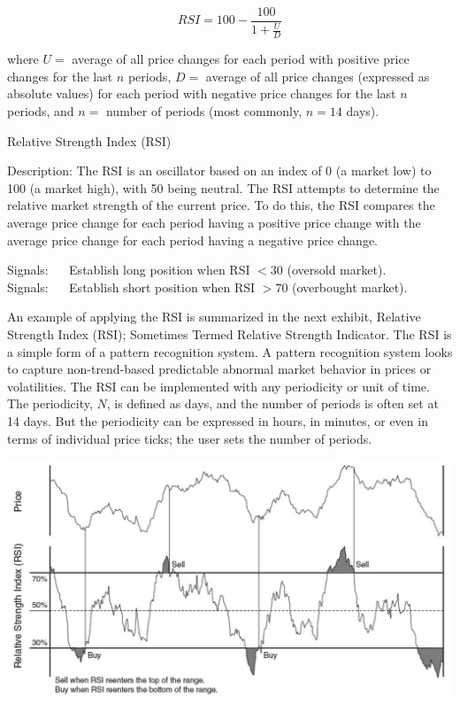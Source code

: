\documentclass[11pt]{article}
\begin{document}
\begin{equation*}
R S I=100-\frac{100}{1+\frac{U}{D}} \tag{4}
\end{equation*}


where $U=$ average of all price changes for each period with positive price changes for the last $n$ periods, $D=$ average of all price changes (expressed as absolute values) for each period with negative price changes for the last $n$ periods, and $n=$ number of periods (most commonly, $n=14$ days).

Relative Strength Index (RSI)

Description: The RSI is an oscillator based on an index of 0 (a market low) to 100 (a market high), with 50 being neutral. The RSI attempts to determine the relative market strength of the current price. To do this, the RSI compares the average price change for each period having a positive price change with the average price change for each period having a negative price change.

Signals: $\quad$ Establish long position when RSI $<30$ (oversold market).\\
Signals: $\quad$ Establish short position when RSI $> 70$ (overbought market).

An example of applying the RSI is summarized in the next exhibit, Relative Strength Index (RSI); Sometimes Termed Relative Strength Indicator. The RSI is a simple form of a pattern recognition system. A pattern recognition system looks to capture non-trend-based predictable abnormal market behavior in prices or volatilities. The RSI can be implemented with any periodicity or unit of time. The periodicity, $N$, is defined as days, and the number of periods is often set at 14 days. But the periodicity can be expressed in hours, in minutes, or even in terms of individual price ticks; the user sets the number of periods.

\begin{center}
\includegraphics[max width=\textwidth]{2024_04_09_5d84553069220c8df1d0g-07}
\end{center}
\end{document}
